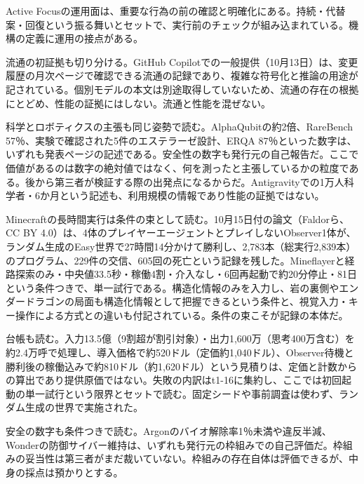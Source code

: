 \documentclass[lualatex,a4paper,10pt]{jlreq}
\begin{document}
Active Focusの運用面は、重要な行為の前の確認と明確化にある。持続・代替案・回復という振る舞いとセットで、実行前のチェックが組み込まれている。機構の定義に運用の接点がある。
\cite{B01,B62,B63,B02,B64,B03}


流通の初証拠も切り分ける。GitHub Copilotでの一般提供（10月13日）は、変更履歴の月次ページで確認できる流通の記録であり、複雑な符号化と推論の用途が記されている。個別モデルの本文は別途取得していないため、流通の存在の根拠にとどめ、性能の証拠にはしない。流通と性能を混ぜない。
\cite{B05,B65,B08,B04,B07,B06}


科学とロボティクスの主張も同じ姿勢で読む。AlphaQubitの約2倍、RareBench 57％、実験で確認された5件のエステラーゼ設計、ERQA 87％といった数字は、いずれも発表ページの記述である。安全性の数字も発行元の自己報告だ。ここで価値があるのは数字の絶対値ではなく、何を測ったと主張しているかの粒度である。後から第三者が検証する際の出発点になるからだ。Antigravityでの1万人科学者・6か月という記述も、利用規模の情報であり性能の証拠ではない。
\cite{B05,B65,B08,B04,B07,B06}


Minecraftの長時間実行は条件の束として読む。10月15日付の論文（Faldorら、CC BY 4.0）は、4体のプレイヤーエージェントとプレイしないObserver1体が、ランダム生成のEasy世界で27時間14分かけて勝利し、2,783本（総実行2,839本）のプログラム、229件の交信、605回の死亡という記録を残した。Mineflayerと経路探索のみ・中央値33.5秒・稼働4割・介入なし・6回再起動で約20分停止・81日という条件つきで、単一試行である。構造化情報のみを入力し、岩の裏側やエンダードラゴンの局面も構造化情報として把握できるという条件と、視覚入力・キー操作による方式との違いも付記されている。条件の束こそが記録の本体だ。
\cite{B05,B65,B08,B04,B07,B06}


台帳も読む。入力13.5億（9割超が割引対象）・出力1,600万（思考400万含む）を約2.4万呼で処理し、導入価格で約520ドル（定価約1,040ドル）、Observer待機と勝利後の稼働込みで約810ドル（約1,620ドル）という見積りは、定価と計数からの算出であり提供原価ではない。失敗の内訳はt1-16に集約し、ここでは初回起動の単一試行という限界とセットで読む。固定シードや事前調査は使わず、ランダム生成の世界で実施された。
\cite{B05,B65,B08,B04,B07,B06}


安全の数字も条件つきで読む。Argonのバイオ解除率1％未満や違反半減、Wonderの防御サイバー維持は、いずれも発行元の枠組みでの自己評価だ。枠組みの妥当性は第三者がまだ裁いていない。枠組みの存在自体は評価できるが、中身の採点は預かりとする。
\cite{B01,B62,B63,B02,B64,B03,B05,B65,B08,B04,B07,B06}
\end{document}
